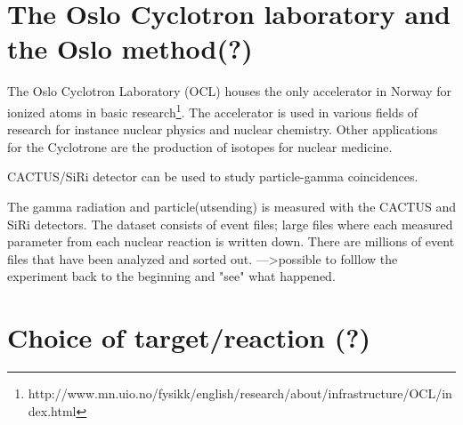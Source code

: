 \documentclass[11pt,a4wide]{article}
\begin{document}
\section{The Oslo Cyclotron laboratory and the Oslo method(?)}
The Oslo Cyclotron Laboratory (OCL) houses the only accelerator in Norway for ionized atoms in basic research\footnote{http://www.mn.uio.no/fysikk/english/research/about/infrastructure/OCL/index.html}. The accelerator is used in various fields of research for instance nuclear physics and nuclear chemistry. Other applications for the Cyclotrone are the production of isotopes for nuclear medicine.







 CACTUS/SiRi detector can be used to study particle-gamma coincidences.

The gamma radiation and particle(utsending) is measured with the CACTUS and SiRi detectors. The dataset consists of event files; large files where each measured parameter from each nuclear reaction is written down. There are millions of event files that have been analyzed and sorted out. --->possible to folllow the experiment back to the beginning and "see" what happened.




\section{Choice of target/reaction (?)}
\end{document}
